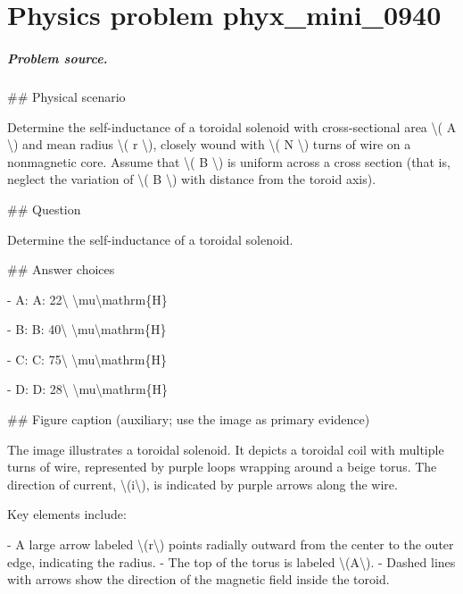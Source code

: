 
\chapter{Physics problem phyx\_mini\_0940}
\label{ch:PhyXMiniProblems_problem_phyx_mini_0940}

\paragraph{Problem source.}
\#\# Physical scenario

Determine the self-inductance of a toroidal solenoid with cross-sectional area \textbackslash{}( A \textbackslash{}) and mean radius \textbackslash{}( r \textbackslash{}), closely wound with \textbackslash{}( N \textbackslash{}) turns of wire on a nonmagnetic core. Assume that \textbackslash{}( B \textbackslash{}) is uniform across a cross section (that is, neglect the variation of \textbackslash{}( B \textbackslash{}) with distance from the toroid axis).

\#\# Question

Determine the self-inductance of a toroidal solenoid.

\#\# Answer choices

- A: A: 22\textbackslash{} \textbackslash{}mu\textbackslash{}mathrm\{H\}

- B: B: 40\textbackslash{} \textbackslash{}mu\textbackslash{}mathrm\{H\}

- C: C: 75\textbackslash{} \textbackslash{}mu\textbackslash{}mathrm\{H\}

- D: D: 28\textbackslash{} \textbackslash{}mu\textbackslash{}mathrm\{H\}

\#\# Figure caption (auxiliary; use the image as primary evidence)

The image illustrates a toroidal solenoid. It depicts a toroidal coil with multiple turns of wire, represented by purple loops wrapping around a beige torus. The direction of current, \textbackslash{}(i\textbackslash{}), is indicated by purple arrows along the wire.

Key elements include:

- A large arrow labeled \textbackslash{}(r\textbackslash{}) points radially outward from the center to the outer edge, indicating the radius.
- The top of the torus is labeled \textbackslash{}(A\textbackslash{}).
- Dashed lines with arrows show the direction of the magnetic field inside the toroid.

